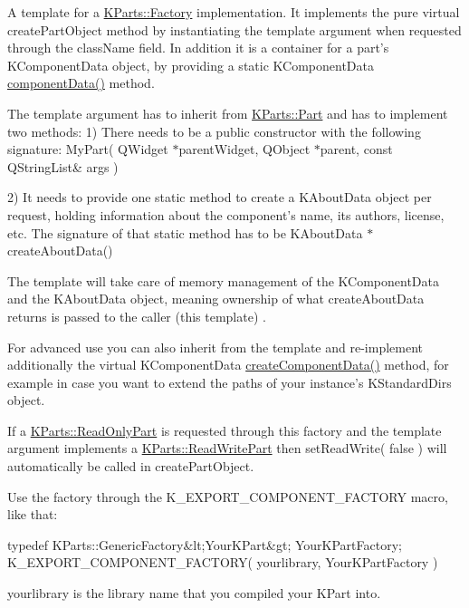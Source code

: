 \-A template for a \hyperlink{classKParts_1_1Factory}{\-K\-Parts\-::\-Factory} implementation. \-It implements the pure virtual create\-Part\-Object method by instantiating the template argument when requested through the class\-Name field. \-In addition it is a container for a part's \-K\-Component\-Data object, by providing a static \-K\-Component\-Data \hyperlink{classKParts_1_1GenericFactoryBase_ad4a0ca70dec2fe8f4e0d4293e17eb776}{component\-Data()} method.

\-The template argument has to inherit from \hyperlink{classKParts_1_1Part}{\-K\-Parts\-::\-Part} and has to implement two methods\-: 1) \-There needs to be a public constructor with the following signature\-: \-My\-Part( Q\-Widget $\ast$parent\-Widget, Q\-Object $\ast$parent, const Q\-String\-List\& args )

2) \-It needs to provide one static method to create a \-K\-About\-Data object per request, holding information about the component's name, its authors, license, etc. \-The signature of that static method has to be \-K\-About\-Data $\ast$create\-About\-Data()

\-The template will take care of memory management of the \-K\-Component\-Data and the \-K\-About\-Data object, meaning ownership of what create\-About\-Data returns is passed to the caller (this template) .

\-For advanced use you can also inherit from the template and re-\/implement additionally the virtual \-K\-Component\-Data \hyperlink{classKParts_1_1GenericFactoryBase_ae90ec2009529241553290269f3108134}{create\-Component\-Data()} method, for example in case you want to extend the paths of your instance's \-K\-Standard\-Dirs object.

\-If a \hyperlink{classKParts_1_1ReadOnlyPart}{\-K\-Parts\-::\-Read\-Only\-Part} is requested through this factory and the template argument implements a \hyperlink{classKParts_1_1ReadWritePart}{\-K\-Parts\-::\-Read\-Write\-Part} then set\-Read\-Write( false ) will automatically be called in create\-Part\-Object.

\-Use the factory through the \-K\-\_\-\-E\-X\-P\-O\-R\-T\-\_\-\-C\-O\-M\-P\-O\-N\-E\-N\-T\-\_\-\-F\-A\-C\-T\-O\-R\-Y macro, like that\-: 
\begin{DoxyCode}
 typedef KParts::GenericFactory&lt;YourKPart&gt; YourKPartFactory;
 K_EXPORT_COMPONENT_FACTORY( yourlibrary, YourKPartFactory )
\end{DoxyCode}
 yourlibrary is the library name that you compiled your \-K\-Part into. 

